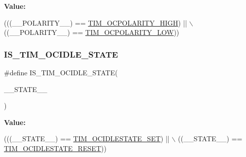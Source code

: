 {\bfseries Value\+:}
\begin{DoxyCode}
(((\_\_POLARITY\_\_) == \hyperlink{group___t_i_m___output___compare___polarity_ga5887380660b742f0045e9695914231b8}{TIM\_OCPOLARITY\_HIGH}) || \(\backslash\)
                                            ((\_\_POLARITY\_\_) == 
      \hyperlink{group___t_i_m___output___compare___polarity_ga1daff1574b0a2d17ccc9ae40a649ac37}{TIM\_OCPOLARITY\_LOW}))
\end{DoxyCode}
\mbox{\label{group___t_i_m___private___macros_ga7c2f6448bbecfc404a3644cc5c978789}} 
\subsubsection{\texorpdfstring{I\+S\+\_\+\+T\+I\+M\+\_\+\+O\+C\+I\+D\+L\+E\+\_\+\+S\+T\+A\+TE}{IS\_TIM\_OCIDLE\_STATE}}
{\footnotesize\ttfamily \#define I\+S\+\_\+\+T\+I\+M\+\_\+\+O\+C\+I\+D\+L\+E\+\_\+\+S\+T\+A\+TE(\begin{DoxyParamCaption}\item[{}]{\+\_\+\+\_\+\+S\+T\+A\+T\+E\+\_\+\+\_\+ }\end{DoxyParamCaption})}

{\bfseries Value\+:}
\begin{DoxyCode}
(((\_\_STATE\_\_) == \hyperlink{group___t_i_m___output___compare___idle___state_gad251b83b0e33ddd0ed2fb35aa747ef78}{TIM\_OCIDLESTATE\_SET}) || \(\backslash\)
                                            ((\_\_STATE\_\_) == 
      \hyperlink{group___t_i_m___output___compare___idle___state_ga56505fe4142096454f1da97683ce8bc2}{TIM\_OCIDLESTATE\_RESET}))
\end{DoxyCode}
\mbox{\label{group___t_i_m___private___macros_gab196fb0e0bafa567b6888e72f0496a55}} 
